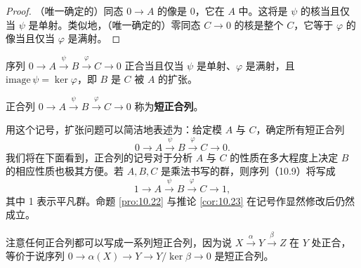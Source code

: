 \begin{proof}
（唯一确定的）同态 \(0 \to A\) 的像是 0，它在 \(A\) 中。这将是 \(\psi\) 的核当且仅当 \(\psi\) 是单射。类似地，（唯一确定的）零同态 \(C \to 0\) 的核是整个 \(C\)，它等于 \(\varphi\) 的像当且仅当 \(\varphi\) 是满射。
\end{proof}

\begin{corollary}\label{cor:10.23}
序列 \(0 \to A \xrightarrow{\psi} B \xrightarrow{\varphi} C \to 0\) 正合当且仅当 \(\psi\) 是单射、\(\varphi\) 是满射，且 \(\mathrm{image}\,\psi = \ker\varphi\)，即 \(B\) 是 \(C\) 被 \(A\) 的扩张。
\end{corollary}

\begin{definition}
正合列 \(0 \to A \xrightarrow{\psi} B \xrightarrow{\varphi} C \to 0\) 称为\textbf{短正合列}。
\end{definition}

用这个记号，扩张问题可以简洁地表述为：给定模 \(A\) 与 \(C\)，确定所有短正合列
\begin{equation}
0 \longrightarrow A \xrightarrow{\psi} B \xrightarrow{\varphi} C \longrightarrow 0. \tag{10.9}
\end{equation}
我们将在下面看到，正合列的记号对于分析 \(A\) 与 \(C\) 的性质在多大程度上决定 \(B\) 的相应性质也极其方便。若 \(A, B, C\) 是乘法书写的群，则序列（10.9）将写成
\begin{equation}
1 \longrightarrow A \xrightarrow{\psi} B \xrightarrow{\varphi} C \longrightarrow 1, \tag{10.9′}
\end{equation}
其中 1 表示平凡群。命题 \ref{pro:10.22} 与推论 \ref{cor:10.23} 在记号作显然修改后仍然成立。

注意任何正合列都可以写成一系列短正合列，因为说 \(X \xrightarrow{\alpha} Y \xrightarrow{\beta} Z\) 在 \(Y\) 处正合，等价于说序列 \(0 \to \alpha(X) \xrightarrow{} Y \to Y/\ker\beta \to 0\) 是短正合列。

